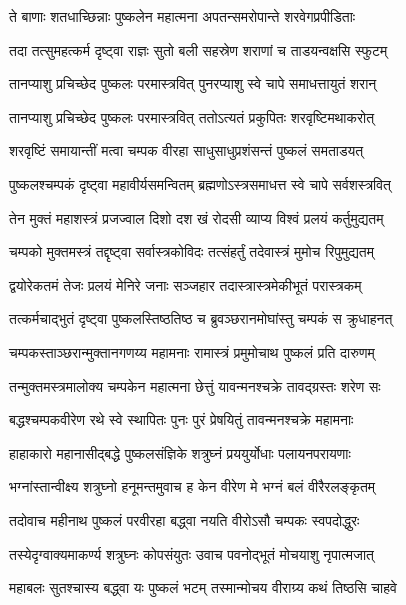 \twolineshloka
{ते बाणाः शतधाच्छिन्नाः पुष्कलेन महात्मना}
{अपतन्समरोपान्ते शरवेगप्रपीडिताः}%

\twolineshloka
{तदा तत्सुमहत्कर्म दृष्ट्वा राज्ञः सुतो बली}
{सहस्रेण शराणां च ताडयन्वक्षसि स्फुटम्}%

\twolineshloka
{तानप्याशु प्रचिच्छेद पुष्कलः परमास्त्रवित्}
{पुनरप्याशु स्वे चापे समाधत्तायुतं शरान्}%

\twolineshloka
{तानप्याशु प्रचिच्छेद पुष्कलः परमास्त्रवित्}
{ततोऽत्यतं प्रकुपितः शरवृष्टिमथाकरोत्}%

\twolineshloka
{शरवृष्टिं समायान्तीं मत्वा चम्पक वीरहा}
{साधुसाधुप्रशंसन्तं पुष्कलं समताडयत्}%

\twolineshloka
{पुष्कलश्चम्पकं दृष्ट्वा महावीर्यसमन्वितम्}
{ब्रह्मणोऽस्त्रसमाधत्त स्वे चापे सर्वशस्त्रवित्}%

\twolineshloka
{तेन मुक्तं महाशस्त्रं प्रजज्वाल दिशो दश}
{खं रोदसी व्याप्य विश्वं प्रलयं कर्तुमुद्यतम्}%

\twolineshloka
{चम्पको मुक्तमस्त्रं तद्दृष्ट्वा सर्वास्त्रकोविदः}
{तत्संहर्तुं तदेवास्त्रं मुमोच रिपुमुद्यतम्}%

\twolineshloka
{द्वयोरेकतमं तेजः प्रलयं मेनिरे जनाः}
{सञ्जहार तदास्त्रास्त्रमेकीभूतं परास्त्रकम्}%

\twolineshloka
{तत्कर्मचाद्भुतं दृष्ट्वा पुष्कलस्तिष्ठतिष्ठ च}
{ब्रुवञ्छरानमोघांस्तु चम्पकं स क्रुधाहनत्}%

\twolineshloka
{चम्पकस्ताञ्छरान्मुक्तानगणय्य महामनाः}
{रामास्त्रं प्रमुमोचाथ पुष्कलं प्रति दारुणम्}%

\twolineshloka
{तन्मुक्तमस्त्रमालोक्य चम्पकेन महात्मना}
{छेत्तुं यावन्मनश्चक्रे तावद्ग्रस्तः शरेण सः}%

\twolineshloka
{बद्धश्चम्पकवीरेण रथे स्वे स्थापितः पुनः}
{पुरं प्रेषयितुं तावन्मनश्चक्रे महामनाः}%

\twolineshloka
{हाहाकारो महानासीद्बद्धे पुष्कलसंज्ञिके}
{शत्रुघ्नं प्रययुर्योधाः पलायनपरायणाः}%

\twolineshloka
{भग्नांस्तान्वीक्ष्य शत्रुघ्नो हनूमन्तमुवाच ह}
{केन वीरेण मे भग्नं बलं वीरैरलङ्कृतम्}%

\twolineshloka
{तदोवाच महीनाथ पुष्कलं परवीरहा}
{बद्ध्वा नयति वीरोऽसौ चम्पकः स्वपदोद्धुरः}%

\twolineshloka
{तस्येदृग्वाक्यमाकर्ण्य शत्रुघ्नः कोपसंयुतः}
{उवाच पवनोद्भूतं मोचयाशु नृपात्मजात्}%

\twolineshloka
{महाबलः सुतश्चास्य बद्ध्वा यः पुष्कलं भटम्}
{तस्मान्मोचय वीराग्र्य कथं तिष्ठसि चाहवे}%


